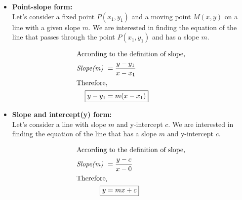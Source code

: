 \begin{itemize}
    \item \textbf{Point-slope form:}\\[2mm]
    Let's consider a fixed point \( P(x_1, y_1) \) and a moving point \( M(x, y) \) on a line with a given slope \( m \). We are interested in finding the equation of the line that passes through the point \( P(x_1, y_1) \) and has a slope \( m \).\\[2mm]
        \begin{center}
        \end{center}
        \begin{align*}
            \intertext{According to the definition of slope,}
            \textit{Slope(m) } &= \frac{y - y_1}{x - x_1} \\
            \intertext{Therefore,}
            \Aboxed{y - y_1 &= m(x - x_1)}
        \end{align*}

    \item \textbf{Slope and intercept(y) form:}\\[2mm]
    Let's consider a line with slope \( m \) and y-intercept \( c \). We are interested in finding the equation of the line that has a slope \( m \) and y-intercept \( c \).\\[2mm]
        \begin{center}
        \end{center}
        \begin{align*}
            \intertext{According to the definition of slope,}
            \textit{Slope(m) } &= \frac{y - c}{x - 0} \\
            \intertext{Therefore,}
            \Aboxed{y &= mx + c}
        \end{align*}


\end{itemize}
